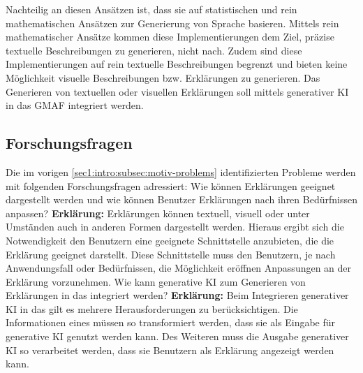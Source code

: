 \med
Nachteilig an diesen Ansätzen ist, dass sie auf statistischen und rein mathematischen Ansätzen zur Generierung von Sprache basieren. Mittels rein mathematischer Ansätze kommen diese Implementierungen dem Ziel, präzise textuelle Beschreibungen zu generieren, nicht nach. Zudem sind diese Implementierungen auf rein textuelle Beschreibungen begrenzt und bieten keine Möglichkeit visuelle Beschreibungen bzw. Erklärungen zu generieren.
\med
\problemstmt{} Das Generieren von textuellen oder visuellen Erklärungen soll mittels generativer KI in das GMAF integriert werden.

\subsection{Forschungsfragen}
\label{sec1:intro:subsec:res-ques}
Die im vorigen \cref{sec1:intro:subsec:motiv-problems} identifizierten Probleme werden mit folgenden Forschungsfragen adressiert:
\med
\researchquestion{} Wie können Erklärungen geeignet dargestellt werden und wie können Benutzer Erklärungen nach ihren Bedürfnissen anpassen?
\med
\textbf{Erklärung:}
Erklärungen können textuell, visuell oder unter Umständen auch in anderen Formen dargestellt werden. Hieraus ergibt sich die Notwendigkeit den Benutzern eine geeignete Schnittstelle anzubieten, die die Erklärung geeignet darstellt. Diese Schnittstelle muss den Benutzern, je nach Anwendungsfall oder Bedürfnissen, die Möglichkeit eröffnen Anpassungen an der Erklärung vorzunehmen.
\med
\researchquestion{} Wie kann generative KI zum Generieren von Erklärungen in das \gmaf{} integriert werden?
\med
\textbf{Erklärung:} Beim Integrieren generativer KI in das \gmaf{} gilt es mehrere Herausforderungen zu berücksichtigen. Die Informationen eines \gcs{} müssen so transformiert werden, dass sie als Eingabe für generative KI genutzt werden kann. Des Weiteren muss die Ausgabe generativer KI so verarbeitet werden, dass sie Benutzern als Erklärung angezeigt werden kann.

